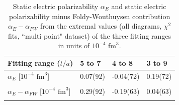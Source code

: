\begin{table}[H]
\begin{center}
    \begin{tabular}{|l|l|l|l|}
    \hline
     Fitting range ($t/a$) 						&  5 to 7 	&  4 to 8 	& 3 to 9	\\ \hline
     $\alpha_E$ [$10^{-4}$ $\text{fm}^3$]   			& 0.07(92)	&-0.04(72)& 0.19(72) \\
     										&	&	&  \\ \hline
     $\alpha_E-\alpha_{FW}$ [$10^{-4}$ $\text{fm}^3$] 	& 0.29(92)	&-0.19(63)& 0.04(63) \\ 
 										&	&	&	\\ \hline
    \end{tabular}
\end{center}
\caption{Static electric polarizability  $\alpha_E$ and static electric polarizability minus Foldy-Wouthuysen contribution $\alpha_E-\alpha_{FW}$ from the extremal values (all diagrams, $\chi^2$ fits, ``multi point" dataset) of the three fitting ranges in units of $10^{-4}$ $\text{fm}^3$. }
\label{tab:FullPolarizabilities}
\end{table}
